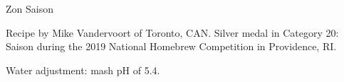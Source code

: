 \begin{recipe}{Zon Saison} %

\begin{aboutblock}
Recipe by Mike Vandervoort of Toronto, CAN. Silver medal in Category 20: Saison
during the 2019 National Homebrew Competition in Providence, RI. \sourceaha
\end{aboutblock}


\begin{methodandtiming}
 
\begin{mashsteps}
\end{mashsteps}

\begin{fermentationsteps}
\end{fermentationsteps}

\begin{directions}
Water adjustment: mash pH of 5.4.
\end{directions}

\end{methodandtiming}

\recipebreak

\begin{ingredientsblock}

\begin{malts}
\end{malts}

\begin{hops}
\end{hops}


\end{ingredientsblock}

\end{recipe}

